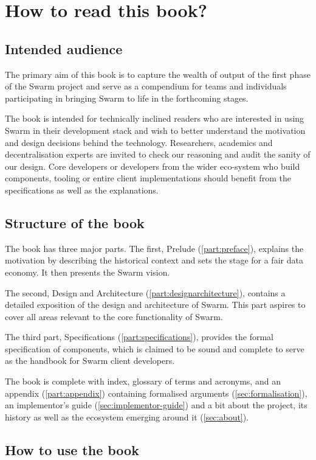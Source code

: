 \chapter{How to read this book?}
\green{}
\section{Intended audience}
The primary aim of this book is to capture the wealth of output of the first phase of the Swarm project and serve as a compendium for teams and individuals participating in bringing Swarm to life in the forthcoming stages.

The book is intended for technically inclined readers who are interested in using Swarm in their development stack and wish to better understand the motivation and design decisions behind the technology. Researchers, academics and decentralisation experts are invited to check our reasoning and audit the sanity of our design. Core developers or developers from the wider eco-system who build components, tooling or entire client implementations should benefit from the specifications as well as the explanations.

\section{Structure of the book}

The book has three major parts. The first, Prelude (\ref{part:preface}), explains the motivation by describing the historical context and sets the stage for a fair data economy. It then presents the Swarm vision.

The second, Design and Architecture (\ref{part:designarchitecture}), contains a detailed exposition of the design and architecture of Swarm. This part aspires to cover all areas relevant to the core functionality of Swarm.

The third part, Specifications (\ref{part:specifications}), provides the formal specification of components, which is claimed to be sound and complete to serve as the handbook for Swarm client developers.

The book is complete with index, glossary of terms and acronyms, and an appendix (\ref{part:appendix}) containing formalised arguments (\ref{sec:formalisation}), an implementor's guide (\ref{sec:implementor-guide}) and a bit about the project, its history as well as the ecosystem emerging around it (\ref{sec:about}).

\section{How to use the book}

